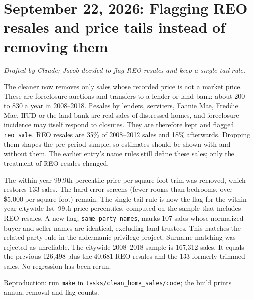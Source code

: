 \section*{September 22, 2026: Flagging REO resales and price tails instead of removing them}
\textit{Drafted by Claude; Jacob decided to flag REO resales and keep a single tail rule.}

The cleaner now removes only sales whose recorded price is not a market price.
These are foreclosure auctions and transfers to a lender or land bank: about
200 to 830 a year in 2008--2018. Resales by lenders, servicers, Fannie Mae,
Freddie Mac, HUD or the land bank are real sales of distressed homes, and
foreclosure incidence may itself respond to closures. They are therefore kept
and flagged \texttt{reo\_sale}. REO resales are 35\% of 2008--2012 sales and
18\% afterwards. Dropping them shapes the pre-period sample, so estimates
should be shown with and without them. The earlier entry's name rules still
define these sales; only the treatment of REO resales changed.

The within-year 99.9th-percentile price-per-square-foot trim was removed, which
restores 133 sales. The hard error screens (fewer rooms than bedrooms, over
\$5,000 per square foot) remain. The single tail rule is now the flag for the
within-year citywide 1st--99th price percentiles, computed on the sample that
includes REO resales. A new flag, \texttt{same\_party\_names}, marks 107 sales
whose normalized buyer and seller names are identical, excluding land trustees.
This matches the related-party rule in the aldermanic-privilege project. Surname
matching was rejected as unreliable. The citywide 2008--2018 sample is 167,312 sales. It
equals the previous 126,498 plus the 40,681 REO resales and the 133 formerly
trimmed sales. No regression has been rerun.

\small
Reproduction: run \texttt{make} in \texttt{tasks/clean\_home\_sales/code}; the
build prints annual removal and flag counts.
\normalsize
